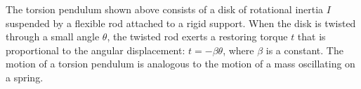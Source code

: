 \documentclass{../../oss-apphys-exam}
\begin{document}
\begin{questions}
    
  \question The torsion pendulum shown above consists of a disk of rotational
  inertia $I$ suspended by a flexible rod attached to a rigid support. When the
  disk is twisted through a small angle $\theta$, the twisted rod exerts a
  restoring torque $t$ that is proportional to the angular displacement:
  $t=-\beta\theta$, where $\beta$ is a constant. The motion of a torsion
  pendulum is analogous to the motion of a mass oscillating on a spring.
\end{questions}
\end{document}
